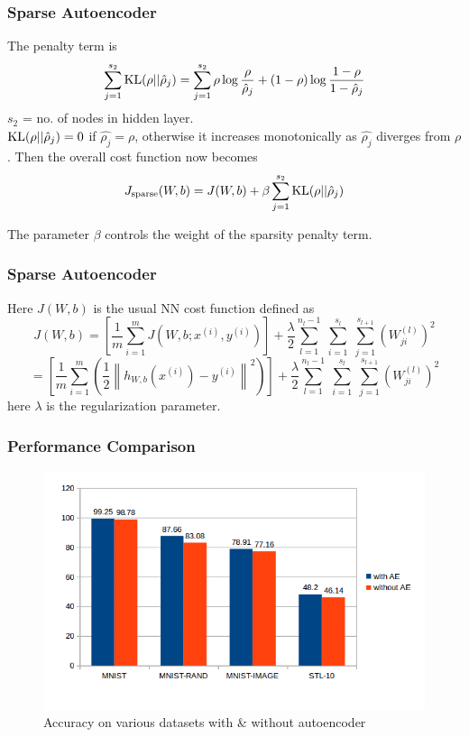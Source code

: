 \documentclass{beamer}
\begin{document}
\begin{frame}
\frametitle{Sparse Autoencoder}
The penalty term is 
\[ \sum_{j=1}^{s_2} {\rm KL}(\rho || \hat\rho_j) = \sum_{j=1}^{s_2} \rho \log \frac{\rho}{\hat\rho_j}
 + (1-\rho) \log \frac{1-\rho}{1-\hat\rho_j} \]
 $s_2$ = no. of nodes in hidden layer.\\
 $\textstyle{{\rm KL}(\rho || \hat\rho_j)=0}$ if $\textstyle{\hat{\rho_j} = \rho}$, otherwise it increases monotonically as $\textstyle{\hat{\rho_j}}$ diverges from $\textstyle{\rho}$. Then the overall cost function now becomes
 \[J_{\rm sparse}(W,b) = J(W,b) + \beta \sum_{j=1}^{s_2} {\rm KL}(\rho || \hat\rho_j)\]

The parameter $\textstyle{\beta}$ controls the weight of the sparsity penalty term.
 
\end{frame}

\begin{frame}
\frametitle{Sparse Autoencoder}
 Here $\textstyle{J(W,b)}$ is the usual NN cost function defined as
\[ J(W,b) = \left[ \frac{1}{m} \sum_{i=1}^m J(W,b;x^{(i)},y^{(i)}) \right]
                       + \frac{\lambda}{2} \sum_{l=1}^{n_l-1} \; \sum_{i=1}^{s_l} \; \sum_{j=1}^{s_{l+1}} \left( W^{(l)}_{ji} \right)^2 \]
\[= \left[ \frac{1}{m} \sum_{i=1}^m \left( \frac{1}{2} \left\| h_{W,b}(x^{(i)}) - y^{(i)} \right\|^2 \right) \right]
                       + \frac{\lambda}{2} \sum_{l=1}^{n_l-1} \; \sum_{i=1}^{s_l} \; \sum_{j=1}^{s_{l+1}} \left( W^{(l)}_{ji} \right)^2 \]
here $\lambda$ is the regularization parameter.\\

\end{frame}


\begin{frame}
\frametitle{Performance Comparison}
\begin{figure}
\includegraphics[width=0.8\linewidth, height=7cm]{figures/acc_comparison}
\caption{Accuracy on various datasets with \& without autoencoder}
\end{figure}
\end{frame}
\end{document}
